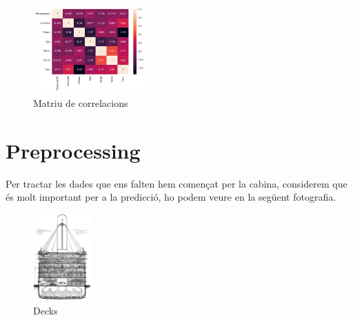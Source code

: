 \documentclass[9pt,a4paper,twoside]{tau-class/tau}
\begin{document}
\begin{figure}[H]
    \centering
    \includegraphics[width=0.4\textwidth]{figures/matriu_corr.png}
    \caption{Matriu de correlacions}
    \label{fig:exemple}
\end{figure}

\section{Preprocessing}

Per tractar les dades que ens falten hem començat per la cabina, considerem que és molt important per a la predicció, ho podem veure en la següent fotografia.

\begin{figure}[H]
    \centering
    \includegraphics[width=0.2\textwidth]{figures/decks.png}
    \caption{Decks}
    \label{fig:exemple}
\end{figure}
\end{document}
